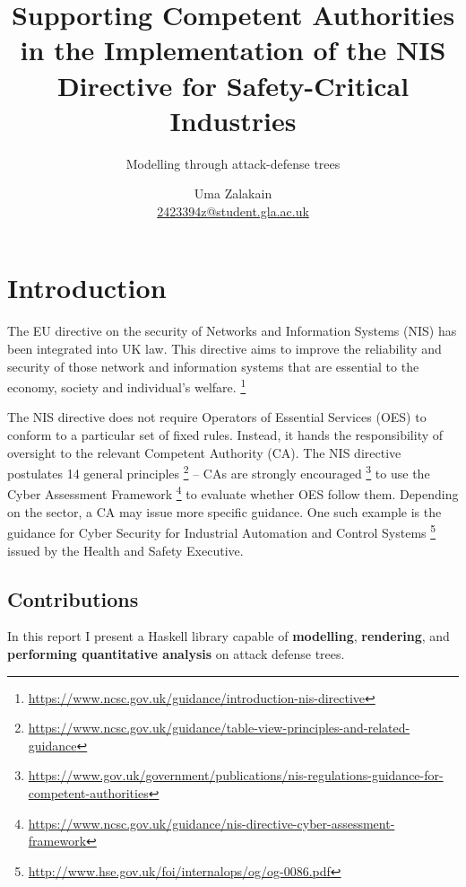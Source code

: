 \documentclass{scrreprt}
\begin{document}
\title{Supporting Competent Authorities in the Implementation of the NIS
Directive for Safety-Critical Industries}
\subtitle{Modelling through attack-defense trees}
\author{Uma Zalakain \\ \href{mailto:2423394z@student.gla.ac.uk}{2423394z@student.gla.ac.uk}}

{\let\newpage\relax\maketitle}
\doclicenseThis
\newpage

\setcounter{tocdepth}{2}
\tableofcontents
\newpage
{}

\chapter{Introduction}

The EU directive on the security of Networks and Information Systems (NIS) has
been integrated into UK law. This directive aims to improve the reliability and
security of those network and information systems that are essential to the
economy, society and individual's welfare.
\footnote{\url{https://www.ncsc.gov.uk/guidance/introduction-nis-directive}}

The NIS directive does not require Operators of Essential Services (OES) to
conform to a particular set of fixed rules. Instead, it hands the responsibility
of oversight to the relevant Competent Authority (CA). The NIS directive
postulates 14 general principles
\footnote{\url{https://www.ncsc.gov.uk/guidance/table-view-principles-and-related-guidance}}
-- CAs are strongly encouraged
\footnote{\url{https://www.gov.uk/government/publications/nis-regulations-guidance-for-competent-authorities}}
to use the Cyber Assessment Framework
\footnote{\url{https://www.ncsc.gov.uk/guidance/nis-directive-cyber-assessment-framework}}
to evaluate whether OES follow them. Depending on the sector, a CA may issue
more specific guidance. One such example is the guidance for Cyber Security for
Industrial Automation and Control Systems
\footnote{\url{http://www.hse.gov.uk/foi/internalops/og/og-0086.pdf}} issued by
the Health and Safety Executive.

\section{Contributions}

In this report I present a Haskell library capable of \textbf{modelling},
\textbf{rendering}, and \textbf{performing quantitative analysis} on attack
defense trees.
\end{document}
